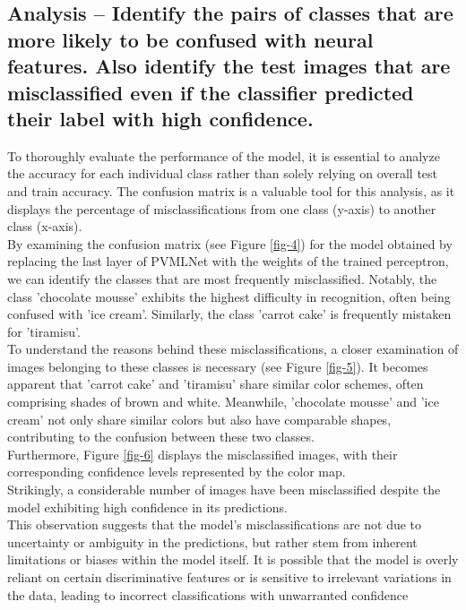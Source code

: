 \documentclass{class}
\begin{document}
\subsection{Analysis -- Identify the pairs of classes that are more likely to be confused with neural features.
    Also identify the test images that are misclassified even if the classifier predicted their
    label with high confidence.}
To thoroughly evaluate the performance of the model, it is essential to analyze the accuracy for each individual class rather than
solely relying on overall test and train accuracy.
The confusion matrix is a valuable tool for this analysis, as it displays the percentage of misclassifications from one class (y-axis) to another class (x-axis).\\
By examining the confusion matrix (see Figure \ref{fig-4}) for the model obtained by replacing the last layer of PVMLNet
with the weights of the trained perceptron, we can identify the classes that are most frequently misclassified.
Notably, the class 'chocolate mousse' exhibits the highest difficulty in recognition, often being confused with 'ice cream'.
Similarly, the class 'carrot cake' is frequently mistaken for 'tiramisu'.\\
To understand the reasons behind these misclassifications, a closer examination of images belonging to these classes is necessary
(see Figure \ref{fig-5}). It becomes apparent that 'carrot cake' and 'tiramisu' share similar color schemes, often comprising shades of brown and white.
Meanwhile, 'chocolate mousse' and 'ice cream' not only share similar colors but also have comparable shapes, contributing to the confusion between these two classes.\\
Furthermore, Figure \ref{fig-6} displays the misclassified images, with their corresponding confidence levels represented by the color map.\\
Strikingly, a considerable number of images have been misclassified despite the model exhibiting high confidence in its predictions.\\
This observation suggests that the model's misclassifications are not due to uncertainty or ambiguity in the predictions,
but rather stem from inherent limitations or biases within the model itself.
It is possible that the model is overly reliant on certain discriminative features or is sensitive to irrelevant variations in the data,
leading to incorrect classifications with unwarranted confidence
\end{document}

